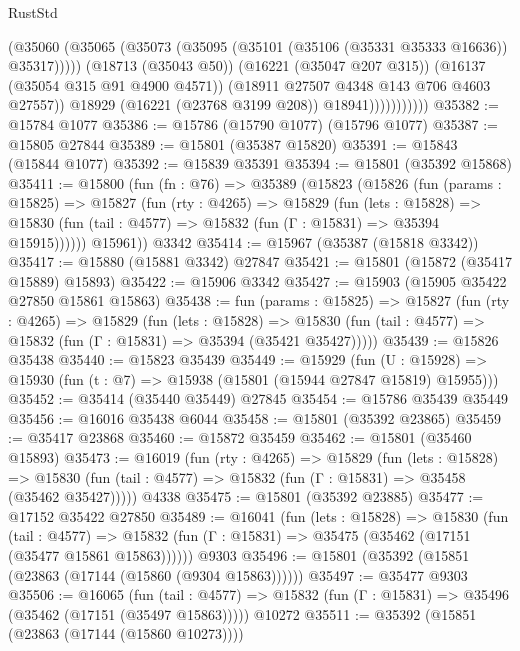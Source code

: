 \begin{lexlean}{RustStd}
\begin{coremodule}
                            (@35060
                              (@35065
                                (@35073 (@35095 (@35101 (@35106 (@35331 @35333 @16636)) @35317)))))
                            (@18713 (@35043 @50))
                            (@16221 (@35047 @207 @315))
                            (@16137 (@35054 @315 @91 @4900 @4571))
                            (@18911 @27507 @4348 @143 @706 @4603 @27557))
                          @18929
                          (@16221 (@23768 @3199 @208))
                          @18941)))))))))))
@35382 := @15784 @1077
@35386 := @15786 (@15790 @1077) (@15796 @1077)
@35387 := @15805 @27844
@35389 := @15801 (@35387 @15820)
@35391 := @15843 (@15844 @1077)
@35392 := @15839 @35391
@35394 := @15801 (@35392 @15868)
@35411 := @15800
    (fun (fn : @76) =>
    @35389
      (@15823
        (@15826
          (fun (params : @15825) =>
          @15827
            (fun (rty : @4265) =>
            @15829
              (fun (lets : @15828) =>
              @15830 (fun (tail : @4577) => @15832 (fun (Γ : @15831) => @35394 @15915))))))
        @15961))
    @3342
@35414 := @15967 (@35387 (@15818 @3342))
@35417 := @15880 (@15881 @3342) @27847
@35421 := @15801 (@15872 (@35417 @15889) @15893)
@35422 := @15906 @3342
@35427 := @15903 (@15905 @35422 @27850 @15861 @15863)
@35438 := fun (params : @15825) =>
  @15827
    (fun (rty : @4265) =>
    @15829
      (fun (lets : @15828) =>
      @15830 (fun (tail : @4577) => @15832 (fun (Γ : @15831) => @35394 (@35421 @35427)))))
@35439 := @15826 @35438
@35440 := @15823 @35439
@35449 := @15929
    (fun (U : @15928) => @15930 (fun (t : @7) => @15938 (@15801 (@15944 @27847 @15819) @15955)))
@35452 := @35414 (@35440 @35449) @27845
@35454 := @15786 @35439 @35449
@35456 := @16016 @35438 @6044
@35458 := @15801 (@35392 @23865)
@35459 := @35417 @23868
@35460 := @15872 @35459
@35462 := @15801 (@35460 @15893)
@35473 := @16019
    (fun (rty : @4265) =>
    @15829
      (fun (lets : @15828) =>
      @15830 (fun (tail : @4577) => @15832 (fun (Γ : @15831) => @35458 (@35462 @35427)))))
    @4338
@35475 := @15801 (@35392 @23885)
@35477 := @17152 @35422 @27850
@35489 := @16041
    (fun (lets : @15828) =>
    @15830
      (fun (tail : @4577) =>
      @15832 (fun (Γ : @15831) => @35475 (@35462 (@17151 (@35477 @15861 @15863))))))
    @9303
@35496 := @15801 (@35392 (@15851 (@23863 (@17144 (@15860 (@9304 @15863))))))
@35497 := @35477 @9303
@35506 := @16065
    (fun (tail : @4577) => @15832 (fun (Γ : @15831) => @35496 (@35462 (@17151 (@35497 @15863)))))
    @10272
@35511 := @35392 (@15851 (@23863 (@17144 (@15860 @10273))))

\end{coremodule}
\end{lexlean}

